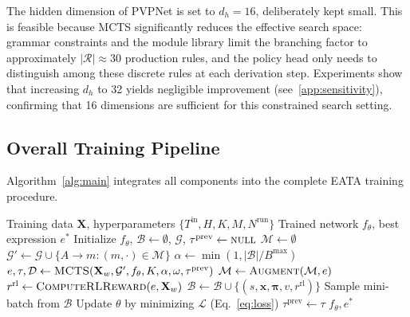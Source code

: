 The hidden dimension of PVPNet is set to $d_h = 16$, deliberately kept small. This is feasible because MCTS significantly reduces the effective search space: grammar constraints and the module library limit the branching factor to approximately $|\mathcal{R}| \approx 30$ production rules, and the policy head only needs to distinguish among these discrete rules at each derivation step. Experiments show that increasing $d_h$ to 32 yields negligible improvement (see~\ref{app:sensitivity}), confirming that 16 dimensions are sufficient for this constrained search setting.

\subsection{Overall Training Pipeline}
\label{subsec:pipeline}

Algorithm~\ref{alg:main} integrates all components into the complete EATA training procedure.

\begin{algorithm}[htbp]
\caption{EATA Training Pipeline}
\label{alg:main}
\begin{algorithmic}[1]
\Require Training data $\mathbf{X}$, hyperparameters $\{T^{\text{in}}, H, K, M, N^{\text{run}}\}$
\Ensure Trained network $f_{\theta}$, best expression $e^{*}$
\State Initialize $f_{\theta}$, $\mathcal{B} \leftarrow \emptyset$, $\mathcal{G}$, $\tau^{\text{prev}} \leftarrow \textsc{null}$
        \State $\mathcal{M} \leftarrow \emptyset$
            \State $\mathcal{G}' \leftarrow \mathcal{G} \cup \{A \rightarrow m : (m, \cdot) \in \mathcal{M}\}$
            \State $\alpha \leftarrow \min(1, |\mathcal{B}| / B^{\max})$ 
            \State $e, \tau, \mathcal{D} \leftarrow \textsc{MCTS}(\mathbf{X}_w, \mathcal{G}', f_{\theta}, K, \alpha, \omega, \tau^{\text{prev}})$
            \State $\mathcal{M} \leftarrow \textsc{Augment}(\mathcal{M}, e)$
        \EndFor
    \EndFor
    \State $r^{\text{rl}} \leftarrow \textsc{ComputeRLReward}(e, \mathbf{X}_w)$ 
        \State $\mathcal{B} \leftarrow \mathcal{B} \cup \{(\mathit{s}, \mathbf{x}, \boldsymbol{\pi}, v, r^{\text{rl}})\}$
    \EndFor
        \State Sample mini-batch from $\mathcal{B}$
        \State Update $\theta$ by minimizing $\mathcal{L}$ (Eq.~\ref{eq:loss})
    \EndIf
    \State $\tau^{\text{prev}} \leftarrow \tau$ 
\EndFor
\State \Return $f_{\theta}, e^{*}$
\end{algorithmic}
\end{algorithm}

